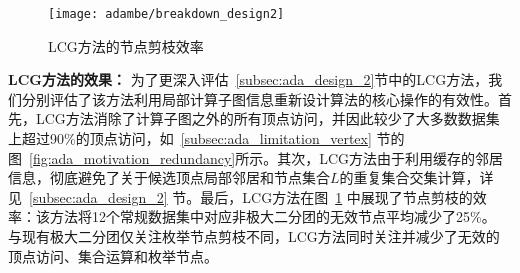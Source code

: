\begin{figure} [t]
	\centering
	\texttt{[image: adambe/breakdown\_design2]}
	\caption{LCG方法的节点剪枝效率}

	\label{fig:ada_breakdown_design2}
\end{figure}


\textbf{LCG方法的效果：} 为了更深入评估~\ref{subsec:ada_design_2}节中的LCG方法，我们分别评估了该方法利用局部计算子图信息重新设计算法的核心操作的有效性。首先，LCG方法消除了计算子图之外的所有顶点访问，并因此较少了大多数数据集上超过90\%的顶点访问，如~\ref{subsec:ada_limitation_vertex} 节的图~\ref{fig:ada_motivation_redundancy}所示。其次，LCG方法由于利用缓存的邻居信息，彻底避免了关于候选顶点局部邻居和节点集合$L$的重复集合交集计算，详见~\ref{subsec:ada_design_2} 节。最后，LCG方法在图~\ref{fig:ada_breakdown_design2} 中展现了节点剪枝的效率：该方法将12个常规数据集中对应非极大二分团的无效节点平均减少了25\%。
与现有极大二分团仅关注枚举节点剪枝不同，LCG方法同时关注并减少了无效的顶点访问、集合运算和枚举节点。







